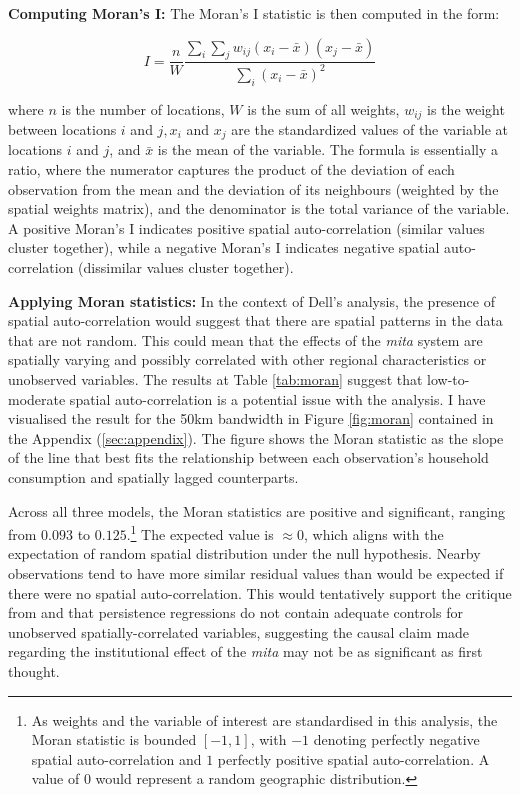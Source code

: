 \documentclass[12pt]{article}
\begin{document}
\textbf{Computing Moran's I:} The Moran's I statistic is then computed in the form:

\begin{equation} \label{eq:3}
I=\frac{n}{W} \frac{\sum_i \sum_j w_{i j}\left(x_i-\bar{x}\right)\left(x_j-\bar{x}\right)}{\sum_i\left(x_i-\bar{x}\right)^2}
\end{equation}

where $n$ is the number of locations, $W$ is the sum of all weights, $w_{i j}$ is the weight between locations $i$ and $j, x_i$ and $x_j$ are the standardized values of the variable at locations $i$ and $j$, and $\bar{x}$ is the mean of the variable. The formula is essentially a ratio, where the numerator captures the product of the deviation of each observation from the mean and the deviation of its neighbours (weighted by the spatial weights matrix), and the denominator is the total variance of the variable. A positive Moran's I indicates positive spatial auto-correlation (similar values cluster together), while a negative Moran's I indicates negative spatial auto-correlation (dissimilar values cluster together). 

\textbf{Applying Moran statistics:} In the context of Dell's analysis, the presence of spatial auto-correlation would suggest that there are spatial patterns in the data that are not random. This could mean that the effects of the \emph{mita} system are spatially varying and possibly correlated with other regional characteristics or unobserved variables. The results at Table \ref{tab:moran} suggest that low-to-moderate spatial auto-correlation is a potential issue with the analysis. I have visualised the result for the 50km bandwidth in Figure \ref{fig:moran} contained in the Appendix (\ref{sec:appendix}). The figure shows the Moran statistic as the slope of the line that best fits the relationship between each observation's household consumption and spatially lagged counterparts. 

Across all three models, the Moran statistics are positive and significant, ranging from $0.093$ to $0.125$.\footnote{As weights and the variable of interest are standardised in this analysis, the Moran statistic is bounded $[-1, 1]$, with $-1$ denoting perfectly negative spatial auto-correlation and $1$ perfectly positive spatial auto-correlation. A value of $0$ would represent a random geographic distribution.} The expected value is $\approx 0$, which aligns with the expectation of random spatial distribution under the null hypothesis. Nearby observations tend to have more similar residual values than would be expected if there were no spatial auto-correlation. This would tentatively support the critique from \autocite{Kelly2019ThePersistence} and \autocite{Kelly2020UnderstandingPersistence} that persistence regressions do not contain adequate controls for unobserved spatially-correlated variables, suggesting the causal claim made regarding the institutional effect of the \emph{mita} may not be as significant as first thought.
\end{document}
